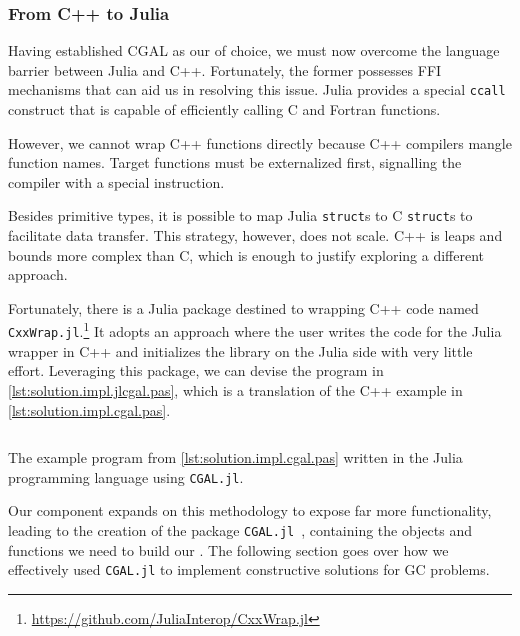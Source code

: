 \subsubsection{From C++ to Julia}%
\label{sec:solution.impl.jlcgal}

Having established \ac{CGAL} as our \geomlibrary{} of choice, we must now
overcome the language barrier between Julia and C++.  Fortunately, the former
possesses \ac{FFI} mechanisms that can aid us in resolving this issue.  Julia
provides a special \texttt{ccall} construct that is capable of
efficiently calling C and Fortran functions.

However, we cannot wrap C++ functions directly because C++ compilers mangle
function names.  Target functions must be externalized first, signalling the
compiler with a special instruction.

Besides primitive types, it is possible to map Julia \texttt{struct}s
to C \texttt{struct}s to facilitate data transfer.  This strategy,
however, does not scale.  C++ is leaps and bounds more complex than C, which is
enough to justify exploring a different approach.

Fortunately, there is a Julia package destined to wrapping C++ code named
\texttt{CxxWrap.jl}.\footnote{\url{https://github.com/JuliaInterop/CxxWrap.jl}}
It adopts an approach where the user writes the code for the Julia wrapper in
C++ and initializes the library on the Julia side with very little effort.  
Leveraging this package, we can devise the program in
\cref{lst:solution.impl.jlcgal.pas}, which is a translation of the C++ example
in \cref{lst:solution.impl.cgal.pas}.

\begin{listing}[htbp]
  \inputminted{julia}{jl/points_and_segments.jl}
  \caption{\label{lst:solution.impl.jlcgal.pas}
    The example program from \cref{lst:solution.impl.cgal.pas} written in the
    Julia programming language using \texttt{CGAL.jl}.}%
\end{listing}

Our \wrapper{} component expands on this methodology to expose far more
functionality, leading to the creation of the package
\texttt{CGAL.jl}~\cite{Ventura:2021:CGAL.jl}, containing the objects and
functions we need to build our \primitives{}.  The following section goes over
how we effectively used \texttt{CGAL.jl} to implement constructive solutions for
\ac{GC} problems.
